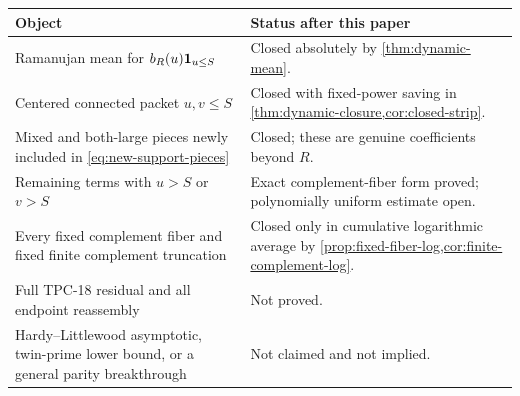 \begin{center}
\begin{tabular}{>{\raggedright\arraybackslash}p{}
                >{\raggedright\arraybackslash}p{}}
\toprule
Object & Status after this paper\\
\midrule
Ramanujan mean for \(b_R(u)\mathbf 1_{u\le S}\)
& Closed absolutely by \cref{thm:dynamic-mean}.\\
\addlinespace
Centered connected packet \(u,v\le S\)
& Closed with fixed-power saving in
  \cref{thm:dynamic-closure,cor:closed-strip}.\\
\addlinespace
Mixed and both-large pieces newly included in
\eqref{eq:new-support-pieces}
& Closed; these are genuine coefficients beyond \(R\).\\
\addlinespace
Remaining terms with \(u>S\) or \(v>S\)
& Exact complement-fiber form proved; polynomially uniform estimate
  open.\\
\addlinespace
Every fixed complement fiber and fixed finite complement truncation
& Closed only in cumulative logarithmic average by
  \cref{prop:fixed-fiber-log,cor:finite-complement-log}.\\
\addlinespace
Full TPC-18 residual and all endpoint reassembly
& Not proved.\\
\addlinespace
Hardy--Littlewood asymptotic, twin-prime lower bound, or a general
parity breakthrough
& Not claimed and not implied.\\
\bottomrule
\end{tabular}
\end{center}
